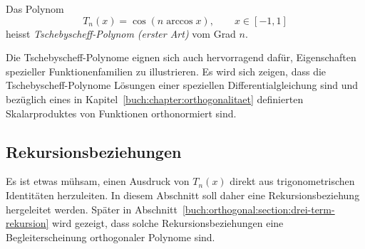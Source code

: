 \begin{definition}
%
\label{buch:potenzen:def:tschebyscheff}
Das Polynom
\[
T_n(x)
=
\cos (n\arccos x),
\qquad
x\in[-1,1]
\]
heisst
{\em Tschebyscheff-Polynom (erster Art)} vom Grad $n$.
\end{definition}
Die Tschebyscheff-Polynome eignen sich auch hervorragend
dafür, Eigenschaften spezieller Funktionenfamilien zu
illustrieren.
Es wird sich zeigen, dass die Tschebyscheff-Polynome
Lösungen einer speziellen Differentialgleichung sind und
bezüglich eines in Kapitel~\ref{buch:chapter:orthogonalitaet}
definierten Skalarproduktes von Funktionen orthonormiert sind.

%
%
\subsection{Rekursionsbeziehungen
\label{buch:potenzen:tschebyscheff:rekursionsbeziehungen}}
Es ist etwas mühsam, einen Ausdruck von $T_n(x)$ direkt aus
trigonometrischen Identitäten herzuleiten.
In diesem Abschnitt soll daher eine Rekursionsbeziehung
hergeleitet werden.
Später in Abschnitt~\ref{buch:orthogonal:section:drei-term-rekursion}
wird gezeigt, dass solche Rekursionsbeziehungen eine Begleiterscheinung
orthogonaler Polynome sind.

%
%
